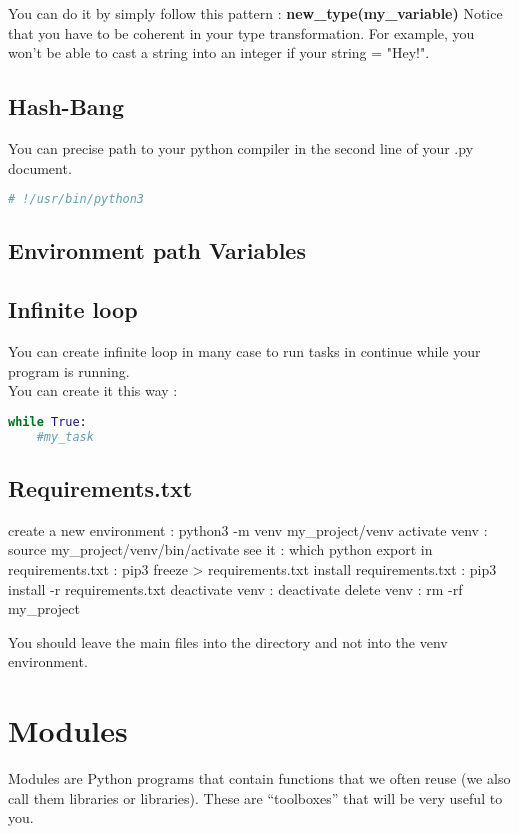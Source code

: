 \documentclass[a4paper, 12pt, titlepage]{scrartcl} %
\begin{document}
You can do it by simply follow this pattern : \textbf{new\_type(my\_variable)}
Notice that you have to be coherent in your type transformation. For example, you won't be able to cast a string into an integer if your string = "Hey!".

\subsection{Hash-Bang}
You can precise path to your python compiler in the second line of your .py document.
\begin{lstlisting}[language=Python]
# !/usr/bin/python3
\end{lstlisting} \vspace{5mm}

\subsection{Environment path Variables}
\label{subsec:PathVariables}

\subsection{Infinite loop}
\label{subsec:While}
You can create infinite loop in many case to run tasks in continue while your program is running. \\
You can create it this way :
\begin{lstlisting}[language=Python]
while True:
    #my_task
\end{lstlisting} \vspace{5mm}

\subsection{Requirements.txt}
create a new environment : python3 -m venv my\_project/venv
activate venv : source my\_project/venv/bin/activate
see it : which python
export in requirements.txt : pip3 freeze > requirements.txt
install requirements.txt : pip3 install -r requirements.txt
deactivate venv : deactivate
delete venv : rm -rf my\_project

You should leave the main files into the directory and not into the venv environment.

\newpage
\section{Modules}
Modules are Python programs that contain functions that we often reuse (we also call them libraries or libraries). These are “toolboxes” that will be very useful to you.
\end{document}
